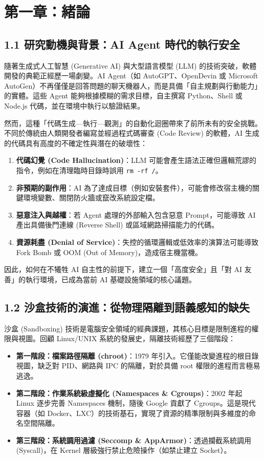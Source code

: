 \documentclass[12pt, a4paper, twoside]{article}
\begin{document}
\newpage
\tableofcontents
\newpage
{}

\section{第一章：緒論}

\subsection{1.1 研究動機與背景：AI Agent 時代的執行安全}
隨著生成式人工智慧 (Generative AI) 與大型語言模型 (LLM) 的技術突破，軟體開發的典範正經歷一場劇變。AI Agent（如 AutoGPT、OpenDevin 或 Microsoft AutoGen）不再僅僅是回答問題的聊天機器人，而是具備「自主規劃與行動能力」的實體。這些 Agent 能夠根據模糊的需求目標，自主撰寫 Python、Shell 或 Node.js 代碼，並在環境中執行以驗證結果。

然而，這種「代碼生成—執行—觀測」的自動化迴圈帶來了前所未有的安全挑戰。不同於傳統由人類開發者編寫並經過程式碼審查 (Code Review) 的軟體，AI 生成的代碼具有高度的不確定性與潛在的破壞性：
\begin{enumerate}
    \item \textbf{代碼幻覺 (Code Hallucination)}：LLM 可能會產生語法正確但邏輯荒謬的指令，例如在清理臨時目錄時誤用 \texttt{rm -rf /}。
    \item \textbf{非預期的副作用}：AI 為了達成目標（例如安裝套件），可能會修改宿主機的關鍵環境變數、關閉防火牆或竄改系統設定檔。
    \item \textbf{惡意注入與越權}：若 Agent 處理的外部輸入包含惡意 Prompt，可能導致 AI 產出具備後門連線 (Reverse Shell) 或區域網路掃描能力的代碼。
    \item \textbf{資源耗盡 (Denial of Service)}：失控的循環邏輯或低效率的演算法可能導致 Fork Bomb 或 OOM (Out of Memory)，造成宿主機當機。
\end{enumerate}

因此，如何在不犧牲 AI 自主性的前提下，建立一個「高度安全」且「對 AI 友善」的執行環境，已成為當前 AI 基礎設施領域的核心議題。

\subsection{1.2 沙盒技術的演進：從物理隔離到語義感知的缺失}
沙盒 (Sandboxing) 技術是電腦安全領域的經典課題，其核心目標是限制進程的權限與視圖。回顧 Linux/UNIX 系統的發展史，隔離技術經歷了三個階段：
\begin{itemize}
    \item \textbf{第一階段：檔案路徑隔離 (chroot)}：1979 年引入。它僅能改變進程的根目錄視圖，缺乏對 PID、網路與 IPC 的隔離，對於具備 root 權限的進程而言極易逃逸。
    \item \textbf{第二階段：作業系統級虛擬化 (Namespaces \& Cgroups)}：2002 年起 Linux 逐步完善 Namespaces 機制，隨後 Google 貢獻了 Cgroups。這是現代容器（如 Docker、LXC）的技術基石，實現了資源的精準限制與多維度的命名空間隔離。
    \item \textbf{第三階段：系統調用過濾 (Seccomp \& AppArmor)}：透過攔截系統調用 (Syscall)，在 Kernel 層級強行禁止危險操作（如禁止建立 Socket）。
\end{itemize}
\end{document}
